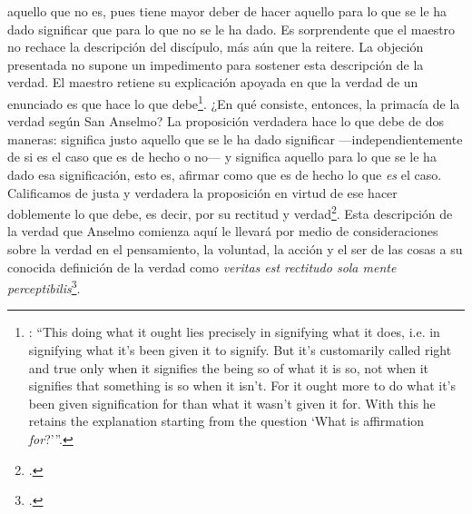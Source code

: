 aquello que no es, pues tiene mayor deber de hacer aquello para lo que se le ha dado significar que para lo que no se le ha dado. Es sorprendente que el maestro no rechace la descripción del discípulo, más aún que la reitere. La objeción presentada no supone un impedimento para sostener esta descripción de la verdad. El maestro retiene su explicación apoyada en que la verdad de un enunciado es que hace lo que debe\footnote{\cite[Cf.][76]{anscombe2011plato:truth}: \enquote{This doing what it ought lies precisely in signifying what it does, i.e. in signifying what it's been given it to signify. But it's customarily called right and true only when it signifies the being so of what it is so, not when it signifies that something is so when it isn't. For it ought more to do what it's been given signification for than what it wasn't given it for. With this he retains the explanation starting from the question `What is affirmation \emph{for}?'}.}. ¿En qué consiste, entonces, la primacía de la verdad según San Anselmo? La proposición verdadera hace lo que debe de dos maneras: significa justo aquello que se le ha dado significar ---independientemente de si es el caso que es de hecho o no--- y significa aquello para lo que se le ha dado esa significación, esto es, afirmar como que es de hecho lo que \emph{es} el caso. Calificamos de justa y verdadera la proposición en virtud de ese hacer doblemente lo que debe, es decir, por su rectitud y verdad\footcite[Cf.][497]{anselm1952obras:deveritate}. Esta descripción de la verdad que Anselmo comienza aquí le llevará por medio de consideraciones sobre la verdad en el pensamiento, la voluntad, la acción y el ser de las cosas a su conocida definición de la verdad como \emph{veritas est rectitudo sola mente perceptibilis}\footcite[522]{anselm1952obras:deveritate}.

